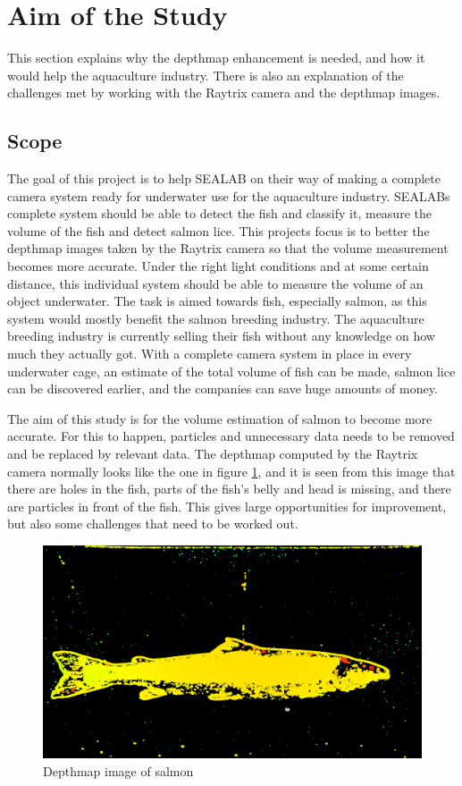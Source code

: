 \section{Aim of the Study}\label{aim of study}

This section explains why the depthmap enhancement is needed, and how it would help the aquaculture industry. There is also an explanation of the challenges met by working with the Raytrix camera and the depthmap images.

\subsection{Scope}

The goal of this project is to help SEALAB on their way of making a complete camera system ready for underwater use for the aquaculture industry. SEALABs complete system should be able to detect the fish and classify it, measure the volume of the fish and detect salmon lice.
This projects focus is to better the depthmap images taken by the Raytrix camera so that the volume measurement becomes more accurate. Under the right light conditions and at some certain distance, this individual system should be able to measure the volume of an object underwater. The task is aimed towards fish, especially salmon, as this system would mostly benefit the salmon breeding industry.
The aquaculture breeding industry is currently selling their fish without any knowledge on how much they actually got. With a complete camera system in place in every underwater cage, an estimate of the total volume of fish can be made, salmon lice can be discovered earlier, and the companies can save huge amounts of money. 

The aim of this study is for the volume estimation of salmon to become more accurate. For this to happen, particles and unnecessary data needs to be removed and be replaced by relevant data. The depthmap computed by the Raytrix camera normally looks like the one in figure \ref{fig:depthmap82}, and it is seen from this image that there are holes in the fish, parts of the fish's belly and head is missing, and there are particles in front of the fish. This gives large opportunities for improvement, but also some challenges that need to be worked out.

\begin{figure}[H]
    \centering
    \includegraphics[width=.7\linewidth]{images/aim_of_study/depthmap82}
    \caption{Depthmap image of salmon}
    \label{fig:depthmap82}
\end{figure}


